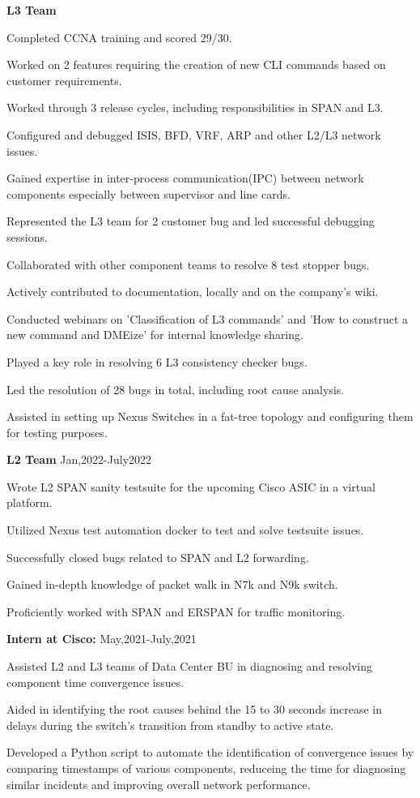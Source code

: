 \documentclass[1pt]{article}
\begin{document}
\textbf{L3 Team}
\begin{compactitem}
\item Completed CCNA training and scored 29/30.
\item Worked on 2 features requiring the creation of new CLI commands based on customer requirements.
\item Worked through 3 release cycles, including responsibilities in SPAN and L3.
\item Configured and debugged ISIS, BFD, VRF, ARP and other L2/L3 network issues.
\item Gained expertise in inter-process communication(IPC) between network components especially between supervisor and line cards.
\item Represented the L3 team for 2 customer bug and led successful debugging sessions.
\item Collaborated with other component teams to resolve 8 test stopper bugs.
\item Actively contributed to documentation, locally and on the company's wiki.
\item Conducted webinars on 'Classification of L3 commands' and 'How to construct a new command and DMEize' for internal knowledge sharing.
\item Played a key role in resolving 6 L3 consistency checker bugs.
\item Led the resolution of 28 bugs in total, including root cause analysis.
\item Assisted in setting up Nexus Switches in a fat-tree topology and configuring them for testing purposes.
\end{compactitem}

\textbf{L2 Team}
\hfill Jan,2022-July2022
\begin{compactitem}

\item    Wrote L2 SPAN sanity testsuite for the upcoming Cisco ASIC in a virtual platform.
\item    Utilized Nexus test automation docker to test and solve testsuite issues.
\item    Successfully closed bugs related to SPAN and L2 forwarding.
\item    Gained in-depth knowledge of packet walk in N7k and N9k switch.
\item    Proficiently worked with SPAN and ERSPAN for traffic monitoring.
\end{compactitem}

\textbf{Intern at Cisco:} 
\hfill May,2021-July,2021
\begin{compactitem}
\item Assisted L2 and L3 teams of Data Center BU in diagnosing and resolving component time convergence issues.
\item Aided in identifying the root causes behind the 15 to 30 seconds increase in delays during the switch's transition from standby to active state.
\item Developed a Python script to automate the identification of convergence issues by comparing timestamps of various components, reduceing the time for  diagnosing similar incidents and improving overall network performance.
\end{compactitem}
\end{document}
